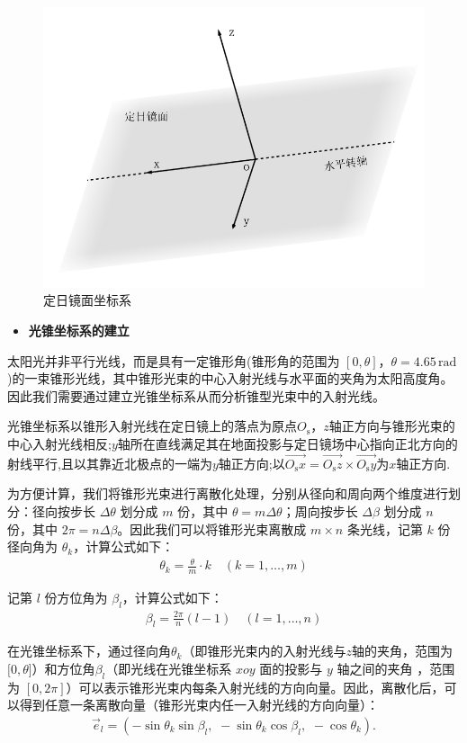 \documentclass[../main.tex]{subfiles}
\begin{document}
\begin{figure}[H]
\centering
\includegraphics[width=.6\textwidth]{2}
\caption{定日镜面坐标系}
\label{1.2}
\end{figure}
\begin{itemize}
\item \textbf{光锥坐标系的建立}
\end{itemize}
\par 太阳光并非平行光线，而是具有一定锥形角(锥形角的范围为 $[0, \theta]$，$\theta = 4.65 \, \mathrm{rad}$)的一束锥形光线，其中锥形光束的中心入射光线与水平面的夹角为太阳高度角。因此我们需要通过建立光锥坐标系从而分析锥型光束中的入射光线。
\par 光锥坐标系以锥形入射光线在定日镜上的落点为原点$O_{\text{s}}$，$z$轴正方向与锥形光束的中心入射光线相反;$y$轴所在直线满足其在地面投影与定日镜场中心指向正北方向的射线平行,且以其靠近北极点的一端为$y$轴正方向;以\( \overrightarrow{O_{\text{s}}x}=\overrightarrow{O_{\text{s}}z}\times \overrightarrow{O_{\text{s}}y}\)为$x$轴正方向. 
\par 为方便计算，我们将锥形光束进行离散化处理，分别从径向和周向两个维度进行划分：径向按步长 $\Delta\theta$ 划分成 $m$ 份，其中 $\theta = m\Delta\theta$；周向按步长 $\Delta\beta$ 划分成 $n$ 份，其中 $2\pi = n\Delta\beta$。因此我们可以将锥形光束离散成 $m \times n$ 条光线，记第 $k$ 份径向角为 $\theta_k$，计算公式如下：
\begin{align}\label{3.89}
  \theta_k = \frac{\theta}{m} \cdot k \quad (k = 1, \ldots, m)
\end{align}
\par 记第 $l$ 份方位角为 $\beta_l$，计算公式如下：
\begin{align}\label{3.90}
  \beta_l = \frac{2\pi}{n} (l - 1) \quad (l = 1, \ldots, n)
\end{align}
\par 在光锥坐标系下，通过径向角$\theta _k$（即锥形光束内的入射光线与$z$轴的夹角，范围为 \([0, \theta\)]）和方位角$\beta _l$（即光线在光锥坐标系 \( xoy \) 面的投影与 \( y\) 轴之间的夹角 ，范围为 \([0, 2\pi]\)）可以表示锥形光束内每条入射光线的方向向量。因此，离散化后，可以得到任意一条离散向量（锥形光束内任一入射光线的方向向量）：  
\begin{align}    \label{1.3}
\vec{e}_l=\left( -\sin \theta _k\sin \beta _l,\,\,-\sin \theta _k\cos \beta _l,\,\,-\cos \theta _k \right) .
\end{align} 
\end{document}
